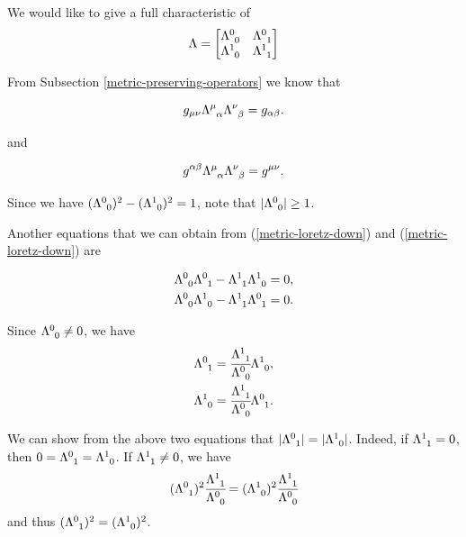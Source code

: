 \documentclass[main.tex]{subfiles}
\begin{document}
We would like to give a full characteristic of 
\begin{equation}
\Lambda = 
\begin{bmatrix}
    \tensor{\Lambda}{^0_0} &  \tensor{\Lambda}{^0_1} \\
    \tensor{\Lambda}{^1_0} & \tensor{\Lambda}{^1_1} \\
\end{bmatrix}
\end{equation}

From Subsection \ref{metric-preserving-operators} we know that

\begin{equation}
\label{metric-loretz-down}
g_{\mu\nu} \tensor{\Lambda}{^\mu_\alpha} \tensor{\Lambda}{^\nu_\beta} = g_{\alpha\beta}. 
\end{equation}

and

\begin{equation}
\label{metric-loretz-up}
g^{\alpha\beta} \tensor{\Lambda}{^\mu_\alpha} \tensor{\Lambda}{^\nu_\beta} = g^{\mu\nu}. 
\end{equation}

Since we have $(\tensor{\Lambda}{^0_0})^2 - (\tensor{\Lambda}{^1_0})^2 = 1$, note that 
$|\tensor{\Lambda}{^0_0}| \geq 1$.

Another equations that we can obtain from (\ref{metric-loretz-down}) and (\ref{metric-loretz-down}) are

\begin{align}
& \tensor{\Lambda}{^0_0}\tensor{\Lambda}{^0_1} - \tensor{\Lambda}{^1_1}\tensor{\Lambda}{^1_0}  = 0,\\
& \tensor{\Lambda}{^0_0}\tensor{\Lambda}{^1_0} - \tensor{\Lambda}{^1_1}\tensor{\Lambda}{^0_1}  = 0.
\end{align}

Since $\tensor{\Lambda}{^0_0}\not=0$, we have 
\begin{align}
& \tensor{\Lambda}{^0_1} = \cfrac{\tensor{\Lambda}{^1_1}}{\tensor{\Lambda}{^0_0}}\tensor{\Lambda}{^1_0}, \\
& \tensor{\Lambda}{^1_0} = \cfrac{\tensor{\Lambda}{^1_1}}{\tensor{\Lambda}{^0_0}}\tensor{\Lambda}{^0_1}.
\end{align}

We can show from the above two equations that $|\tensor{\Lambda}{^0_1}| = |\tensor{\Lambda}{^1_0}|$. Indeed, if $\tensor{\Lambda}{^1_1} = 0$, then $0 = \tensor{\Lambda}{^0_1} = \tensor{\Lambda}{^1_0}$. If $\tensor{\Lambda}{^1_1} \not= 0$, we have 
\begin{equation}
(\tensor{\Lambda}{^0_1})^2 \cfrac{\tensor{\Lambda}{^1_1}}{\tensor{\Lambda}{^0_0}}
= (\tensor{\Lambda}{^1_0})^2 \cfrac{\tensor{\Lambda}{^1_1}}{\tensor{\Lambda}{^0_0}}
\end{equation}
and thus $(\tensor{\Lambda}{^0_1})^2 = (\tensor{\Lambda}{^1_0})^2$.
\end{document}
